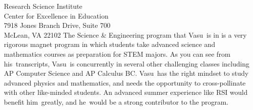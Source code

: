 \documentclass[10pt]{letter}
\newcommand\firstname{Vasu}
\newcommand\subject{he}
\newcommand\object{him}
\newcommand\possessive{his}
\begin{document}
\begin{letter}{%
Research Science Institute\\
Center for Excellence in Education\\
7918 Jones Branch Drive, Suite 700\\
McLean, VA 22102
}
The Science \& Engineering program that \firstname\ is in is a very rigorous magnet program in which students take advanced science and mathematics courses as preparation for STEM majors. As you can see from \possessive\ transcripts, \firstname\ is concurrently in several other challenging classes including AP Computer Science and AP Calculus BC. \firstname\ has the right mindset to study advanced physics and mathematics, and needs the opportunity to cross-pollinate with other like-minded students. An advanced summer experience like RSI would benefit \object\ greatly, and \subject\ would be a strong contributor to the program. 

\noclosing

\end{letter}
\end{document}
